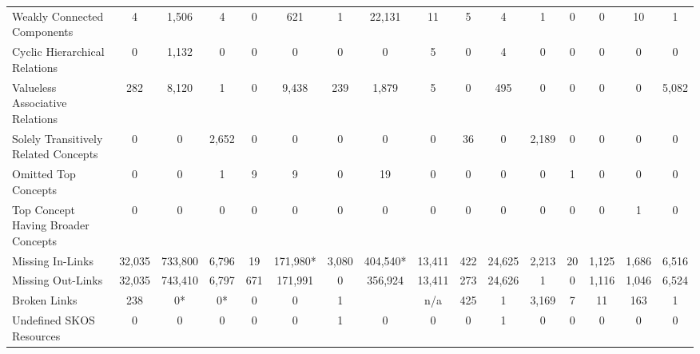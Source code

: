 \begin{table}[h]
\begin{center}
{\begin{tabular}{lccccccccccccccc}
Weakly Connected Components & 4 & 1,506 & 4 & 0 & 621 & 1 & 22,131 & 11 & 5 & 4 & 1 & 0 & 0 & 10 & 1 \\

Cyclic Hierarchical Relations & 0 & 1,132 & 0 & 0 & 0 & 0 & 0 & 5 & 0 & 4 & 0 & 0 & 0 & 0 & 0 \\

Valueless Associative Relations & 282 & 8,120 & 1 & 0 & 9,438 & 239 & 1,879 & 5 & 0 & 495 & 0 & 0 & 0 & 0 & 5,082 \\

Solely Transitively Related Concepts & 0 & 0 & 2,652 & 0 & 0 & 0 & 0 & 0 & 36 & 0 & 2,189 & 0 & 0 & 0 & 0 \\

Omitted Top Concepts & 0 & 0 & 1 & 9 & 9 & 0 & 19 & 0 & 0 & 0 & 0 & 1 & 0 & 0 & 0 \\

Top Concept Having Broader Concepts & 0 & 0 & 0 & 0 & 0 & 0 & 0 & 0 & 0 & 0 & 0 & 0 & 0 & 1 & 0 \\

\midrule

Missing In-Links & 32,035 & 733,800 & 6,796 & 19 & 171,980* & 3,080 & 404,540* & 13,411 & 422 & 24,625 & 2,213 & 20 & 1,125 & 1,686 & 6,516 \\

Missing Out-Links & 32,035 & 743,410 & 6,797 & 671 & 171,991 & 0 & 356,924 & 13,411 & 273 & 24,626 & 1 & 0 & 1,116 & 1,046 & 6,524 \\

Broken Links & 238 & 0* & 0* & 0 & 0 & 1 && n/a & 425 & 1 & 3,169 & 7 & 11 & 163 & 1 \\

Undefined SKOS Resources & 0 & 0 & 0 & 0 & 0 & 1 & 0 & 0 & 0 & 1 & 0 & 0 & 0 & 0 & 0 \\

\bottomrule
\end{tabular}
}
\end{center}
\end{table}

